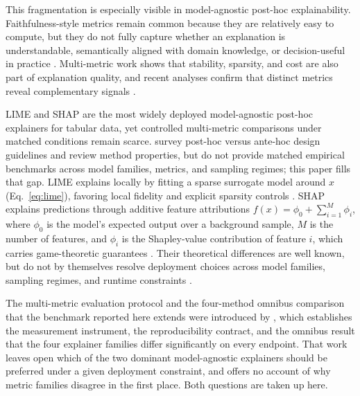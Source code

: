 \documentclass[10pt]{article}
\begin{document}
\begin{sloppypar}
This fragmentation is especially visible in model-agnostic post-hoc
explainability. Faithfulness-style metrics remain common because they are
relatively easy to compute, but they do not fully capture whether an
explanation is understandable, semantically aligned with domain knowledge,
or decision-useful in practice
\citep{ali2023trustworthy,longo2024manifesto}.
Multi-metric work shows that stability, sparsity, and cost are also
part of explanation quality, and recent analyses confirm that distinct
metrics reveal complementary signals \citep{pawlicki2024metrics,zheng2025ffidelity}.
\end{sloppypar}

LIME and SHAP are the most widely deployed model-agnostic post-hoc
explainers for tabular data, yet controlled multi-metric comparisons
under matched conditions remain scarce. \citet{retzlaff2024posthoc} survey post-hoc versus ante-hoc design
guidelines and review method properties, but do not provide matched
empirical benchmarks across model families, metrics, and sampling regimes;
this paper fills that gap. LIME explains locally by
fitting a sparse surrogate model around $x$ (Eq.~\ref{eq:lime}),
favoring local fidelity and explicit sparsity controls
\citep{ribeiro2016why}. SHAP explains predictions through additive
feature attributions $f(x) = \phi_0 + \sum_{i=1}^{M} \phi_i$, where
$\phi_0$ is the model's expected output over a background sample, $M$
is the number of features, and $\phi_i$ is the Shapley-value contribution
of feature $i$, which carries game-theoretic guarantees
\citep{lundberg2017unified}. Their theoretical differences are well
known, but do not by themselves resolve deployment choices across model
families, sampling regimes, and runtime constraints
\citep{retzlaff2024posthoc,ali2023trustworthy}.

The multi-metric evaluation protocol and the four-method omnibus comparison
that the benchmark reported here extends were introduced by
\citet{herrera2026framework}, which establishes the measurement instrument,
the reproducibility contract, and the omnibus result that the four
explainer families differ significantly on every endpoint. That work leaves
open which of the two dominant model-agnostic explainers should be preferred
under a given deployment constraint, and offers no account of why metric
families disagree in the first place. Both questions are taken up here.
\end{document}
